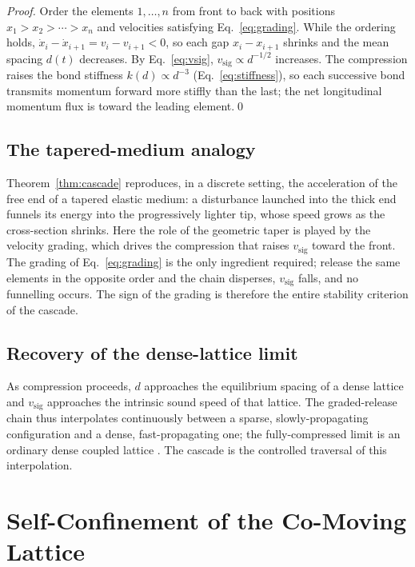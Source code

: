 \documentclass[twocolumn,10pt,a4paper]{article}
\theoremstyle{thmstyle}
\theoremstyle{definition}
\theoremstyle{remark}
\newcommand{\vsig}{v_{\mathrm{sig}}}
\begin{document}
\begin{proof}
Order the elements $1,\dots,n$ from front to back with positions
$x_1>x_2>\cdots>x_n$ and velocities satisfying Eq.~\eqref{eq:grading}. While
the ordering holds, $\dot x_i - \dot x_{i+1} = v_i - v_{i+1} <0$, so each gap
$x_i-x_{i+1}$ shrinks and the mean spacing $d(t)$ decreases. By
Eq.~\eqref{eq:vsig}, $\vsig\propto d^{-1/2}$ increases. The compression raises
the bond stiffness $k(d)\propto d^{-3}$ (Eq.~\eqref{eq:stiffness}), so each
successive bond transmits momentum forward more stiffly than the last; the
net longitudinal momentum flux is toward the leading element.\qed
\end{proof}

\subsection{The tapered-medium analogy}

Theorem~\ref{thm:cascade} reproduces, in a discrete setting, the
acceleration of the free end of a tapered elastic medium: a disturbance
launched into the thick end funnels its energy into the progressively lighter
tip, whose speed grows as the cross-section shrinks. Here the role of the
geometric taper is played by the velocity grading, which drives the
compression that raises $\vsig$ toward the front. The grading of
Eq.~\eqref{eq:grading} is the only ingredient required; release the same
elements in the opposite order and the chain disperses, $\vsig$ falls, and no
funnelling occurs. The sign of the grading is therefore the entire stability
criterion of the cascade.

\subsection{Recovery of the dense-lattice limit}

As compression proceeds, $d$ approaches the equilibrium spacing of a dense
lattice and $\vsig$ approaches the intrinsic sound speed of that lattice. The
graded-release chain thus interpolates continuously between a sparse,
slowly-propagating configuration and a dense, fast-propagating one; the
fully-compressed limit is an ordinary dense coupled lattice
\citep{ashcroft1976}. The cascade is the controlled traversal of this
interpolation.

\section{Self-Confinement of the Co-Moving Lattice}
\label{sec:transverse}
\end{document}
